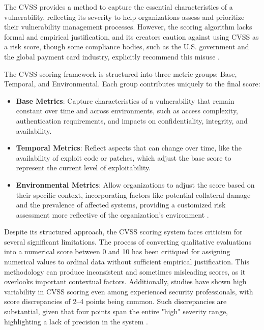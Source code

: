 The \ac{CVSS} provides a method to capture the essential characteristics of a vulnerability, reflecting its severity to help organizations assess and prioritize their vulnerability management processes. However, the scoring algorithm lacks formal and empirical justification, and its creators caution against using \ac{CVSS} as a risk score, though some compliance bodies, such as the U.S. government and the global payment card industry, explicitly recommend this misuse \autocite{spring_time_2021}.

The \ac{CVSS} scoring framework is structured into three metric groups: Base, Temporal, and Environmental. Each group contributes uniquely to the final score:

\begin{itemize} 
    \item \textbf{Base Metrics}: Capture characteristics of a vulnerability that remain constant over time and across environments, such as access complexity, authentication requirements, and impacts on confidentiality, integrity, and availability. 
    \item \textbf{Temporal Metrics}: Reflect aspects that can change over time, like the availability of exploit code or patches, which adjust the base score to represent the current level of exploitability. 
    \item \textbf{Environmental Metrics}: Allow organizations to adjust the score based on their specific context, incorporating factors like potential collateral damage and the prevalence of affected systems, providing a customized risk assessment more reflective of the organization's environment \autocite{mell_common_2006}. 
\end{itemize}

Despite its structured approach, the \ac{CVSS} scoring system faces criticism for several significant limitations. The process of converting qualitative evaluations into a numerical score between 0 and 10 has been critiqued for assigning numerical values to ordinal data without sufficient empirical justification. This methodology can produce inconsistent and sometimes misleading scores, as it overlooks important contextual factors. Additionally, studies have shown high variability in \ac{CVSS} scoring even among experienced security professionals, with score discrepancies of 2–4 points being common. Such discrepancies are substantial, given that four points span the entire "high" severity range, highlighting a lack of precision in the system \autocite{spring_time_2021}.

